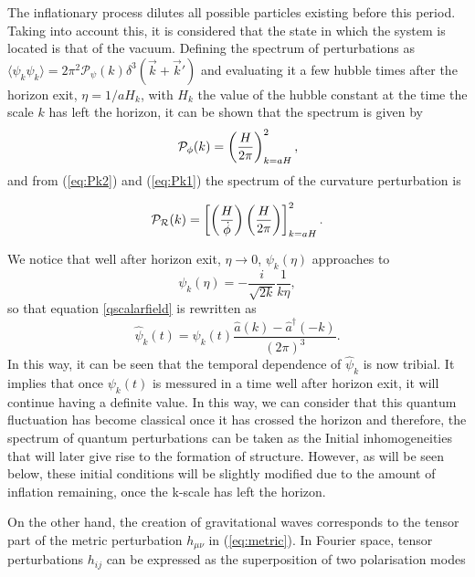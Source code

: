 \documentclass{rmaa}
\def\beq{\begin{equation}}
\def\eeq{\end{equation}}
\def\cal{\mathcal}
\begin{document}
The inflationary process dilutes all possible particles existing before this period. 
Taking into account this, it is considered that the state in which the system is located is that of the vacuum. 
Defining the spectrum of perturbations as 
$\langle\psi_k\psi_k\rangle =2\pi^2 \mathcal{P}_\psi\left(k\right)\delta ^3\left(\vec{k}+\vec{k}'\right)$ 
and evaluating it a few hubble times after the horizon exit, $\eta=1/aH_k$, with $H_k$ the value of 
the hubble constant at the time the scale $k$ has left the horizon, it can be shown that the spectrum is given by
%
\beq\label{eq:Pk2}
\cal P_{\phi}(k)=\left( {H \over 2\pi }\right)^2_{k=aH},
\eeq
%
and from (\ref{eq:Pk2}) and (\ref{eq:Pk1}) the spectrum of the curvature perturbation is 

\begin{equation}
\cal P_{\cal R}(k) = \left[ \left({H \over \dot \phi}\right) \left({H \over 2 \pi}\right)\right]^2_{k =
a H} .
\end{equation}

We notice that well after horizon exit, $\eta \rightarrow 0$, $\psi_k\left(\eta\right)$ approaches to
\begin{equation}
\psi_k\left(\eta\right)=-\frac{i}{\sqrt{2k}}\frac{1}{k\eta},
\end{equation}
so that equation \ref{qscalarfield} is rewritten as
\begin{equation}
\hat{\psi}_k\left(t\right)=\psi_k\left(t\right)\frac{\hat{a}\left(k\right)-\hat{a}^\dagger\left(-k\right)}{\left(2\pi\right)^3}.
\end{equation}
In this way, it can be seen that the temporal dependence of $\hat{\psi}_k$ is now tribial. It implies that once $\psi_k\left(t\right)$ is messured in a time well after horizon exit, it will continue having a definite value. In this way, we can consider that  this quantum fluctuation has become classical once it has crossed the horizon and therefore, the spectrum of quantum perturbations can be taken as the Initial inhomogeneities that will later give rise to the formation of structure. However, as will be seen below, these initial conditions will be slightly modified due to the amount of inflation remaining, once the k-scale has left the horizon.
 
On the other hand, the creation of gravitational waves corresponds to the tensor 
part of the metric perturbation $h_{\mu \nu}$ in (\ref{eq:metric}). In Fourier space, 
tensor perturbations $h_{ij}$ can be expressed as the superposition of two polarisation modes
\end{document}
